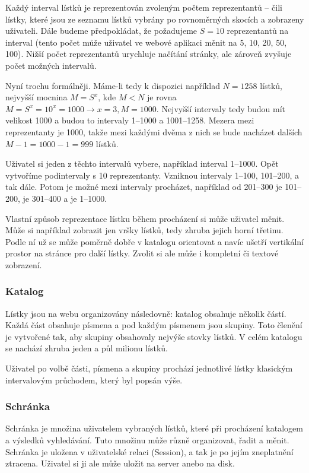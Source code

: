Každý interval lístků je reprezentován zvoleným počtem reprezentantů -- čili lístky, které jsou ze seznamu lístků vybrány po rovnoměrných skocích a zobrazeny uživateli. Dále budeme předpokládat, že požadujeme $S=10$ reprezentantů na interval (tento počet může uživatel ve webové aplikaci měnit na 5, 10, 20, 50, 100). Nižší počet reprezentantů urychluje načítání stránky, ale zároveň zvyšuje počet možných intervalů.

Nyní trochu formálněji. Máme-li tedy k dispozici například $N=1258$ lístků, nejvyšší mocnina $M=S^x$, kde $M<N$ je rovna $M=S^x=10^x=1000 \rightarrow x=3, M=1000$. Nejvyšší intervaly tedy budou mít velikost 1000 a budou to intervaly 1--1000 a 1001--1258. Mezera mezi reprezentanty je 1000, takže mezi každými dvěma z nich se bude nacházet dalších $M-1=1000-1=999$ lístků.

Uživatel si jeden z těchto intervalů vybere, například interval 1--1000. Opět vytvoříme podintervaly s 10 reprezentanty. Vzniknou  intervaly 1--100, 101--200, a tak dále. Potom je možné mezi intervaly procházet, například  od 201--300 je 101--200,  je 301--400 a  je 1--1000. 

Vlastní způsob reprezentace lístku během procházení si může uživatel měnit. Může si například zobrazit jen vršky lístků, tedy zhruba jejich horní třetinu. Podle ní už se může poměrně dobře v katalogu orientovat a navíc ušetří vertikální prostor na stránce pro další lístky. Zvolit si ale může i kompletní či textové zobrazení.

\subsubsection{Katalog}

Lístky jsou na webu organizovány následovně: katalog obsahuje několik částí. Každá část obsahuje písmena a pod každým písmenem jsou skupiny. Toto členění je vytvořené tak, aby skupiny obsahovaly nejvýše stovky lístků. V celém katalogu se nachází zhruba jeden a půl milionu lístků.

Uživatel po volbě části, písmena a skupiny prochází jednotlivé lístky klasickým intervalovým průchodem, který byl popsán výše.

\subsubsection{Schránka}

Schránka je množina uživatelem vybraných lístků, které  při procházení katalogem a výsledků vyhledávání. Tuto množinu může různě organizovat, řadit a měnit. Schránka je uložena v uživatelské relaci (Session), a tak je po jejím zneplatnění ztracena. Uživatel si ji ale může uložit na server anebo na disk. 

